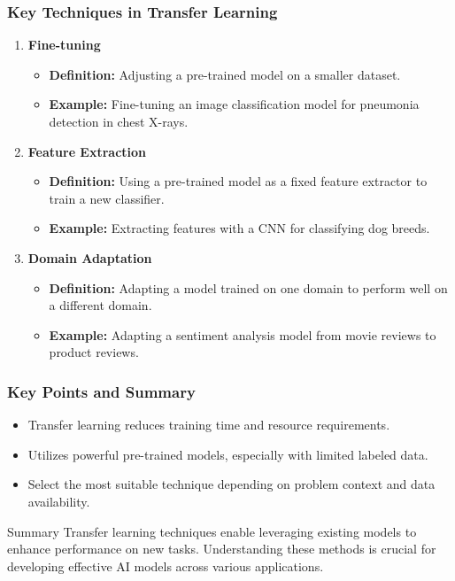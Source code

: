 \documentclass[aspectratio=169]{beamer}
\begin{document}
\begin{frame}[fragile]
  \frametitle{Key Techniques in Transfer Learning}
  \begin{enumerate}
    \item \textbf{Fine-tuning}
    \begin{itemize}
      \item \textbf{Definition:} Adjusting a pre-trained model on a smaller dataset.
      \item \textbf{Example:} Fine-tuning an image classification model for pneumonia detection in chest X-rays.
    \end{itemize}
    
    \item \textbf{Feature Extraction}
    \begin{itemize}
      \item \textbf{Definition:} Using a pre-trained model as a fixed feature extractor to train a new classifier.
      \item \textbf{Example:} Extracting features with a CNN for classifying dog breeds.
    \end{itemize}

    \item \textbf{Domain Adaptation}
    \begin{itemize}
      \item \textbf{Definition:} Adapting a model trained on one domain to perform well on a different domain.
      \item \textbf{Example:} Adapting a sentiment analysis model from movie reviews to product reviews.
    \end{itemize}
  \end{enumerate}
\end{frame}

\begin{frame}[fragile]
  \frametitle{Key Points and Summary}
  \begin{itemize}
    \item Transfer learning reduces training time and resource requirements.
    \item Utilizes powerful pre-trained models, especially with limited labeled data.
    \item Select the most suitable technique depending on problem context and data availability.
  \end{itemize}

  \begin{block}{Summary}
    Transfer learning techniques enable leveraging existing models to enhance performance on new tasks. Understanding these methods is crucial for developing effective AI models across various applications.
  \end{block}
\end{frame}
\end{document}
